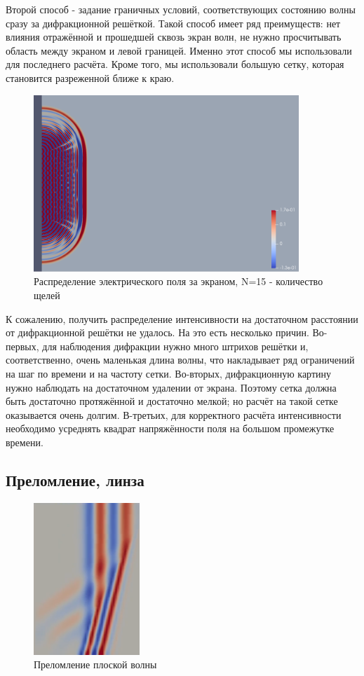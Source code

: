 \documentclass[
11pt,%
tightenlines,%
twoside,%
onecolumn,%
nofloats,%
nobibnotes,%
nofootinbib,%
superscriptaddress,%
noshowpacs,%
centertags]%
{revtex4}
\begin{document}
Второй способ - задание граничных условий, соответствующих состоянию волны сразу за дифракционной 
решёткой. Такой способ имеет ряд преимуществ: нет влияния отражённой и прошедшей сквозь экран волн, 
не нужно просчитывать область между экраном и левой границей. Именно этот способ мы использовали для 
последнего расчёта. Кроме того, мы использовали большую сетку, которая становится разреженной ближе
к краю.
\begin{figure}[h]
    \centering
    \includegraphics[width=10cm]{N=15__27.png}
    \caption{Распределение электрического поля за экраном, N=15 - количество щелей}
    \label{fig:1}
\end{figure}
К сожалению, получить распределение интенсивности на достаточном расстоянии от дифракционной решётки не удалось. 
На это есть несколько причин. Во-первых, для наблюдения дифракции нужно много штрихов решётки 
и, соответственно, очень маленькая длина волны, что накладывает ряд ограничений на шаг по времени 
и на частоту сетки. Во-вторых, дифракционную картину нужно наблюдать на достаточном удалении от 
экрана. Поэтому сетка должна быть достаточно протяжённой и достаточно мелкой; но расчёт на такой сетке 
оказывается очень долгим. В-третьих, для корректного расчёта интенсивности необходимо усреднять 
квадрат напряжённости поля на большом промежутке времени. \newline


\subsection{Преломление, линза}
\begin{figure}
    \centering
    \includegraphics[width=4cm]{refraction.png}
    \caption{Преломление плоской волны}
    \label{fig:1}
\end{figure}
\end{document}

